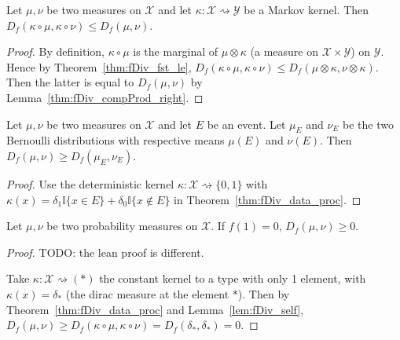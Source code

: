 \begin{theorem}
  \label{thm:fDiv_data_proc}
  Let $\mu, \nu$ be two measures on $\mathcal X$ and let $\kappa : \mathcal X \rightsquigarrow \mathcal Y$ be a Markov kernel.
  Then $D_f(\kappa \circ \mu, \kappa \circ \nu) \le D_f(\mu, \nu)$.
\end{theorem}

\begin{proof}
By definition, $\kappa \circ \mu$ is the marginal of $\mu \otimes \kappa$ (a measure on $\mathcal X \times \mathcal Y$) on $\mathcal Y$. Hence by Theorem~\ref{thm:fDiv_fst_le}, $D_f(\kappa \circ \mu, \kappa \circ \nu) \le D_f(\mu \otimes \kappa, \nu \otimes \kappa)$. Then the latter is equal to $D_f(\mu, \nu)$ by Lemma~\ref{thm:fDiv_compProd_right}.
\end{proof}

\begin{corollary}
  \label{cor:data_proc_event}
  Let $\mu, \nu$ be two measures on $\mathcal X$ and let $E$ be an event. Let $\mu_E$ and $\nu_E$ be the two Bernoulli distributions with respective means $\mu(E)$ and $\nu(E)$. Then $D_f(\mu, \nu) \ge D_f(\mu_E, \nu_E)$.
\end{corollary}

\begin{proof}
Use the deterministic kernel $\kappa : \mathcal X \rightsquigarrow \{0, 1\}$ with $\kappa(x) = \delta_1 \mathbb{I}\{x \in E\} + \delta_0 \mathbb{I}\{x \notin E\}$ in Theorem~\ref{thm:fDiv_data_proc}.
\end{proof}

\begin{lemma}
  \label{lem:fDiv_nonneg}
  \leanok
  Let $\mu, \nu$ be two probability measures on $\mathcal X$. If $f(1) = 0$, $D_f(\mu, \nu) \ge 0$.
\end{lemma}

\begin{proof} \leanok
{}
TODO: the lean proof is different.

Take $\kappa : \mathcal X \rightsquigarrow (*)$ the constant kernel to a type with only 1 element, with $\kappa(x) = \delta_*$ (the dirac measure at the element $*$).
Then by Theorem~\ref{thm:fDiv_data_proc} and Lemma~\ref{lem:fDiv_self}, $D_f(\mu, \nu) \ge D_f(\kappa \circ \mu, \kappa \circ \nu) = D_f(\delta_*, \delta_*) = 0$.
\end{proof}

